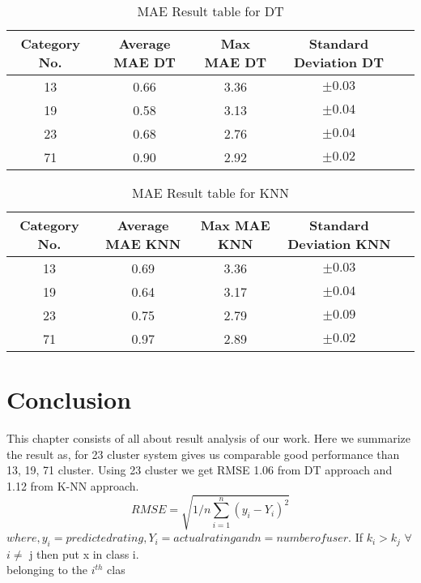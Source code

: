 \documentclass{article}
\begin{document}
\begin{table}[ht]
	\begin{center}
		\begin{tabular}{ |c|c|c|c|c| } 
			\hline 
			Category No. & Average MAE DT & Max MAE DT & Standard Deviation DT \\
			\hline
			13  & 0.66	& 3.36	& $\pm0.03$\\
			19	& 0.58	& 3.13	& $\pm0.04$\\
			23	& 0.68	& 2.76	& $\pm0.04$\\
			71	& 0.90	& 2.92	& $\pm0.02$\\
			
			\hline
		\end{tabular}
		\caption{MAE Result table for DT}
		\label{MaetableResdt}
	\end{center}
	
\end{table}

\begin{table}[H]
	\begin{center}
		\begin{tabular}{ |c|c|c|c|c| } 
			\hline 
			Category No. & Average MAE KNN & Max MAE KNN & Standard Deviation KNN \\
			\hline
			13	& 0.69	& 3.36	& $\pm0.03$\\
			19	& 0.64	& 3.17	& $\pm0.04$\\
			23	& 0.75	& 2.79	& $\pm0.09$\\
			71	& 0.97	& 2.89	& $\pm0.02$\\
			
			\hline
		\end{tabular}
		\caption{MAE Result table for KNN}
		\label{MaetableReskn}
	\end{center}
	
\end{table} 

\section{Conclusion}
\noindent This chapter consists of all about result analysis of our work. Here we summarize the result as, for 23 cluster system gives us comparable good performance than 13, 19, 71 cluster. Using 23 cluster we get RMSE 1.06 from DT approach and 1.12 from K-NN approach.
\begin{equation}
RMSE =\sqrt{1/n \sum_{i=1}^n (y_i - Y_i)^2} 
\label{rmse2}
\end{equation}
$where, y_i = predicted rating, Y_i = actual rating and n = number of user.$
If $k_i > k_j$  $\forall$  $i \neq$ j then put x in class i.\\ 
belonging to the $i^{th}$ clas
\end{document}
